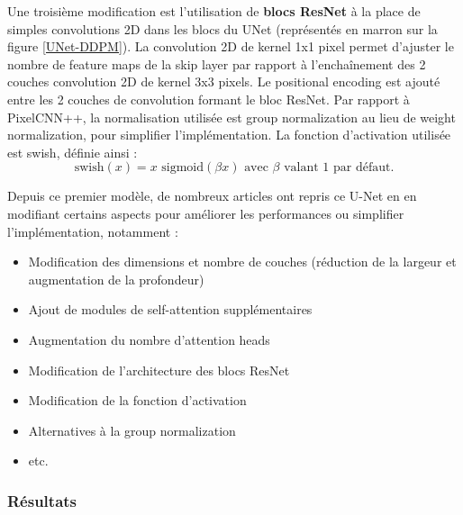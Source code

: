 \documentclass{article}
\begin{document}
Une troisième modification est l'utilisation de \textbf{blocs ResNet} à la place de simples convolutions 2D dans les blocs du UNet (représentés en marron sur la figure \ref{UNet-DDPM}). La convolution 2D de kernel 1x1 pixel permet d'ajuster le nombre de feature maps de la skip layer par rapport à l'enchaînement des 2 couches convolution 2D de kernel 3x3 pixels. Le positional encoding est ajouté entre les 2 couches de convolution formant le bloc ResNet. Par rapport à PixelCNN++, la normalisation utilisée est group normalization au lieu de weight normalization, pour simplifier l'implémentation. La fonction d'activation utilisée est swish, définie ainsi :
$$\text{swish}(x) = x \text{ sigmoid}(\beta x) \text{ avec $\beta$ valant 1 par défaut.}$$

Depuis ce premier modèle, de nombreux articles ont repris ce U-Net en en modifiant certains aspects pour améliorer les performances ou simplifier l'implémentation, notamment :
\begin{itemize}
    \item Modification des dimensions et nombre de couches (réduction de la largeur et augmentation de la profondeur)
    \item Ajout de modules de self-attention supplémentaires
    \item Augmentation du nombre d'attention heads
    \item Modification de l'architecture des blocs ResNet
    \item Modification de la fonction d'activation
    \item Alternatives à la group normalization
    \item etc.
\end{itemize}

\subsubsection{Résultats}
\end{document}
